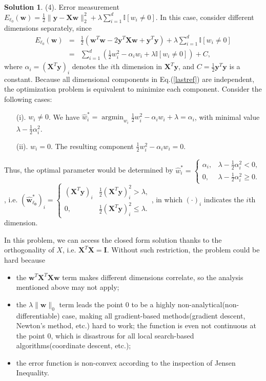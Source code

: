 \documentclass[a4paper,UTF8]{article}
\numberwithin{equation}{section}
\theoremstyle{definition}
\newtheorem*{solution}{Solution}
\begin{document}
\begin{solution}
\item[(4).] Error measurement $E_{\ell_0}(\bm{w})=\frac{1}{2}\lVert \mathbf{y} - \mathbf X \mathbf{w} \rVert_2^2 +\lambda\sum_{i=1}^d \mathbb{I}[w_i \neq 0]$. In this case, consider different dimensions separately, since
\begin{eqnarray}\label{lastref}
E_{\ell_0}(\bm{w})&=&\frac{1}{2}(\bm{w}^T\bm{w}-2\bm{y}^T\bm{Xw}+\bm{y}^T\bm{y})+ \lambda\sum_{i=1}^d \mathbb{I}[w_i \neq 0]\nonumber\\
&=&\sum_{i=1}^d\left(\frac{1}{2}w_i^2-\alpha_iw_i+\lambda\mathbb{I}[w_i \neq 0]\right)+C,
\end{eqnarray}
where $\alpha_i=(\bm{X}^T\bm{y})_i$ denotes the $i$th dimension in $\bm{X}^T\bm{y}$, and $C=\frac{1}{2}\bm{y}^T\bm{y}$ is a constant. Because all dimensional components in Eq.(\ref{lastref}) are independent, the optimization problem is equivalent to minimize each component. Consider the following cases:
\begin{itemize}
\item[(i).] $w_i\neq 0$. We have $\hat{w}_i^*=\mathop{\arg\min}_{w_i}\frac{1}{2}w_i^2-\alpha_iw_i +\lambda=\alpha_i$, with minimal value $\lambda-\frac{1}{2}\alpha_i^2$.
\item[(ii).] $w_i= 0$. The resulting component $\frac{1}{2}w_i^2-\alpha_iw_i=0$.
\end{itemize}
Thus, the optimal parameter would be determined by $\hat{w}_i^*=\left\{ \begin{array}{ll}\alpha_i, & \lambda-\frac{1}{2}\alpha_i^2<0, \\0, & \lambda-\frac{1}{2}\alpha_i^2\geq 0.\end{array}\right.$, i.e. $(\bm{\hat{w}_{\ell_0}^*})_i =\left\{ \begin{array}{ll}(\bm{X}^T\bm{y})_i & \frac{1}{2}(\bm{X}^T\bm{y})_i^2>\lambda, \\0, & \frac{1}{2}(\bm{X}^T\bm{y})_i^2\leq\lambda.\end{array}\right.$, in which $(\cdot)_i$ indicates the $i$th dimension.

In this problem, we can access the closed form solution thanks to the orthogonality of $X$, i.e. $\bm{X}^T\bm{X}=\bm{I}$. Without such restriction, the problem could be hard because
\begin{itemize}
\item the $\bm{w}^T\bm{X}^T\bm{Xw}$ term makes different dimensions correlate, so the analysis mentioned above may not apply;
\item the $\lambda \lVert \mathbf{w}\rVert_0$ term leads the point 0 to be a highly non-analytical(non-differentiable) case, making all gradient-based methods(gradient descent, Newton's method, etc.) hard to work; the function is even not continuous at the point 0, which is disastrous for all local search-based algorithms(coordinate descent, etc.);
\item the error function is non-convex according to the inspection of Jensen Inequality\cite{ref: nonconvex}.
\end{itemize}
\end{solution}
\end{document}
